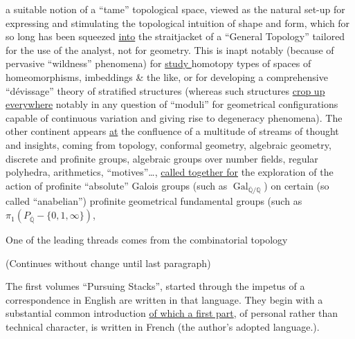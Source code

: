 a suitable notion of a ``tame'' topological space, viewed as the natural set-up for expressing and stimulating the topological intuition of shape and form, which for so long has been squeezed \uline{into} the straitjacket of a ``General Topology'' tailored for the use of the analyst, not for geometry. This is inapt notably (because of pervasive ``wildness'' phenomena) for \uline{ study } homotopy types of spaces of homeomorphisms, imbeddings \& the like, or for developing a comprehensive ``dévissage'' theory of stratified structures (whereas such structures  \uline{crop up everywhere} notably in any question of ``moduli'' for geometrical configurations capable of continuous variation and giving rise to degeneracy phenomena). The other continent appears \uline{at} the confluence of a multitude of streams of thought and insights, coming from topology, conformal geometry, algebraic geometry, discrete and profinite groups, algebraic groups over number fields, regular polyhedra, arithmetics, ``motives''\ldots, \uline{called together for} the exploration of the action of profinite ``absolute'' Galois groups (such as $\operatorname{Gal}_{\overline{\mathbb{Q}}/\mathbb{Q}}$) on certain (so called ``anabelian'') profinite geometrical fundamental groups (such as $\pi_{1}(P_{\overline{\mathbb{Q}}}-\{0,1,\infty\})$,

One of the leading threads comes from the combinatorial topology

(Continues without change until last paragraph)

The  first  volumes ``Pursuing Stacks'', started\textendash{} through the impetus of a correspondence in English are written in that language. They begin with a substantial common introduction \uline{of which a first part}, of personal rather than technical character, is written in French (the author's adopted language.).
